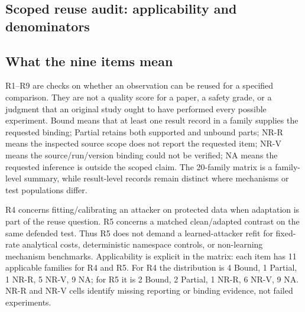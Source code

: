 \subsection{Scoped reuse audit: applicability and denominators}\label{sec:r8-sok-audit}

\subsection{What the nine items mean}
R1--R9 are checks on whether an observation can be reused for a specified comparison. They are not a quality score for a paper, a safety grade, or a judgment that an original study ought to have performed every possible experiment. Bound means that at least one result record in a family supplies the requested binding; Partial retains both supported and unbound parts; NR-R means the inspected source scope does not report the requested item; NR-V means the source/run/version binding could not be verified; NA means the requested inference is outside the scoped claim. The 20-family matrix is a family-level summary, while result-level records remain distinct where mechanisms or test populations differ.

R4 concerns fitting/calibrating an attacker on protected data when adaptation is part of the reuse question. R5 concerns a matched clean/adapted contrast on the same defended test. Thus R5 does not demand a learned-attacker refit for fixed-rate analytical costs, deterministic namespace controls, or non-learning mechanism benchmarks. Applicability is explicit in the matrix: each item has 11 applicable families for R4 and R5. For R4 the distribution is 4 Bound, 1 Partial, 1 NR-R, 5 NR-V, 9 NA; for R5 it is 2 Bound, 2 Partial, 1 NR-R, 6 NR-V, 9 NA. NR-R and NR-V cells identify missing reporting or binding evidence, not failed experiments.

